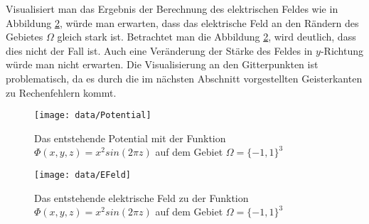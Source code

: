 Visualisiert man das Ergebnis der Berechnung des elektrischen Feldes wie in Abbildung \ref{fig:EFeld}, würde man erwarten, dass das elektrische Feld an den Rändern des Gebietes $\Omega$ gleich stark ist. Betrachtet man die Abbildung \ref{fig:EFeld}, wird deutlich, dass dies nicht der Fall ist. Auch eine Veränderung der Stärke des Feldes in $y$-Richtung würde man nicht erwarten. Die Visualisierung an den Gitterpunkten ist problematisch, da es durch die im nächsten Abschnitt vorgestellten Geisterkanten zu Rechenfehlern kommt.
\begin{figure}[h!] 
	\centering
	\texttt{[image: data/Potential]} 
	\caption{Das entstehende Potential mit der Funktion $\Phi(x,y,z)=x^2sin(2\pi z)$ auf dem Gebiet $\Omega = \{-1,1\}^3$} 
	\label{fig:Pot} 
\end{figure} 
\begin{figure}[h!] 
	\centering
	\texttt{[image: data/EFeld]} 
	\caption{Das entstehende elektrische Feld zu der Funktion $\Phi(x,y,z)=x^2sin(2\pi z)$ auf dem Gebiet $\Omega = \{-1,1\}^3$} 
	\label{fig:EFeld} 
\end{figure} 
 
